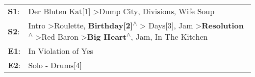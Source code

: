 \begin{supertabular}{p{0.03\textwidth}p{0.92\textwidth}}
 \textbf{S1}:  &                                                                                                                                                                                                                                                                                                                         Der Bluten Kat[1]\textsuperscript{} \textgreater \enspace Dump City\textsuperscript{}, \enspace Divisions\textsuperscript{}, \enspace Wife Soup\textsuperscript{}  \enspace  \\
 \textbf{S2}:  &  Intro\textsuperscript{} \textgreater \enspace Roulette\textsuperscript{}, \enspace \textbf{Birthday[2]\textsuperscript{$\wedge$}} \textgreater {} Days[3]\textsuperscript{}, \enspace Jam\textsuperscript{} \textgreater \enspace \textbf{Resolution\textsuperscript{$\wedge$}} \textgreater \enspace Red Baron\textsuperscript{} \textgreater \enspace \textbf{Big Heart\textsuperscript{$\wedge$}}, \enspace Jam\textsuperscript{}, \enspace In The Kitchen\textsuperscript{}  \enspace  \\
 \textbf{E1}:  &                                                                                                                                                                                                                                                                                                                                                                                                                                                     In Violation of Yes\textsuperscript{}  \enspace  \\
 \textbf{E2}:  &                                                                                                                                                                                                                                                                                                                                                                                                                                                         Solo - Drums[4]\textsuperscript{}  \enspace  \\
\end{supertabular}
